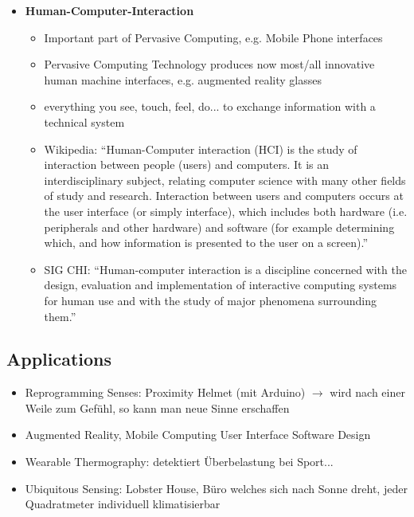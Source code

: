 \begin{itemize}
	\item \textbf{Human-Computer-Interaction}
	\begin{itemize}
		\item Important part of Pervasive Computing, e.g. Mobile Phone interfaces
		\item Pervasive Computing Technology produces now most/all innovative human machine interfaces, e.g. augmented reality glasses
		\item everything you see, touch, feel, do... to exchange information with a technical system
		\item Wikipedia: “Human-Computer interaction (HCI) is the study of interaction between people (users) and computers. It is an interdisciplinary subject, relating computer science with many other fields of study and research. Interaction between users and computers occurs at the user interface (or simply interface), which includes both hardware (i.e. peripherals and other hardware) and software (for example determining which, and how information is presented to the user on a screen).”
		\item SIG CHI: “Human-computer interaction is a discipline concerned with the design, evaluation and implementation of interactive computing systems for human use and with the study of major phenomena surrounding them.”
	\end{itemize}
\end{itemize}
\subsection{Applications}
\begin{itemize}
	\item Reprogramming Senses: Proximity Helmet (mit Arduino) $\rightarrow$ wird nach einer Weile zum Gefühl, so kann man neue Sinne erschaffen
	\item Augmented Reality, Mobile Computing User Interface Software Design
	\item Wearable Thermography: detektiert Überbelastung bei Sport...
	\item Ubiquitous Sensing: Lobster House, Büro welches sich nach Sonne dreht, jeder Quadratmeter individuell klimatisierbar
\end{itemize} 

